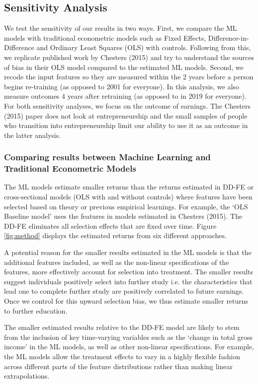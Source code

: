\documentclass[12pt, a4paper]{article}
\begin{document}
\subsection{Sensitivity Analysis}

We test the sensitivity of our results in two ways. First, we compare the ML models with traditional econometric models such as Fixed Effects, Difference-in-Difference and Ordinary Least Squares (OLS) with controls. Following from this, we replicate published work by Chesters (2015) and try to understand the sources of bias in their OLS model compared to the estimated ML models. Second, we recode the input features so they are measured within the 2 years before a person begins re-training (as opposed to 2001 for everyone). In this analysis, we also measure outcomes 4 years after retraining (as opposed to in 2019 for everyone). For both sensitivity analyses, we focus on the outcome of earnings. The Chesters (2015) paper does not look at entrepreneurship and the small samples of people who transition into entrepreneurship limit our ability to use it as an outcome in the latter analysis.


\subsubsection{Comparing results between Machine Learning and Traditional Econometric Models}

The ML models estimate smaller returns than the returns estimated in DD-FE or cross-sectional models (OLS with and without controls) where features have been selected based on theory or previous empirical learnings. For example, the `OLS Baseline model' uses the features in models estimated in Chesters (2015). The DD-FE eliminates all selection effects that are fixed over time. Figure \ref{fig:method} displays the estimated returns from six different approaches.

A potential reason for the smaller results estimated in the ML models is that the additional features included, as well as the non-linear specifications of the features, more effectively account for selection into treatment. The smaller results suggest individuals positively select into further study i.e. the characteristics that lead one to complete further study are positively correlated to future earnings. Once we control for this upward selection bias, we thus estimate smaller returns to further education.

The smaller estimated results relative to the DD-FE model are likely to stem from the inclusion of key time-varying variables such as the `change in total gross income' in the ML models, as well as other non-linear specifications. For example, the ML models allow the treatment effects to vary in a highly flexible fashion across different parts of the feature distributions rather than making linear extrapolations.
\end{document}
